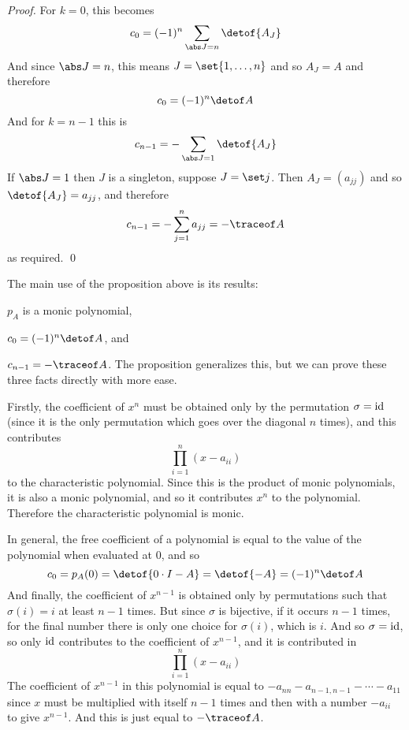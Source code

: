 \begin{proof}
    For $k=0$, this becomes
    \[ c_0 = (-1)^n\sum_{\abs J=n}\detof{A_J} \]
    And since $\abs J=n$, this means $J=\set{1,\dots,n}$ and so $A_J=A$ and therefore
    \[ c_0 = (-1)^n\detof A \]
    And for $k=n-1$ this is
    \[ c_{n-1} = -\sum_{\abs J=1}\detof{A_J} \]
    If $\abs J=1$ then $J$ is a singleton, suppose $J=\set j$.
    Then $A_J=(a_{jj})$ and so $\detof{A_J}=a_{jj}$, and therefore
    \[ c_{n-1} = -\sum_{j=1}^n a_{jj} = -\traceof A \]
    as required.
    \qed

\end{proof}

\begin{note}

    The main use of the proposition above is its results:
    \benum
        \item $p_A$ is a monic polynomial,
        \item $c_0=(-1)^n\detof A$, and
        \item $c_{n-1}=-\traceof A$.
    \eenum
    The proposition generalizes this, but we can prove these three facts directly with more ease.

    Firstly, the coefficient of $x^n$ must be obtained only by the permutation $\sigma=\mathrm{id}$ (since it is the only permutation which goes over the diagonal $n$ times), and this contributes
    \[ \prod_{i=1}^n (x-a_{ii}) \]
    to the characteristic polynomial.
    Since this is the product of monic polynomials, it is also a monic polynomial, and so it contributes $x^n$ to the polynomial.
    Therefore the characteristic polynomial is monic.

    In general, the free coefficient of a polynomial is equal to the value of the polynomial when evaluated at $0$, and so
    \[ c_0 = p_A(0) = \detof{0\cdot I-A} = \detof{-A} = (-1)^n\detof A \]
    And finally, the coefficient of $x^{n-1}$ is obtained only by permutations such that $\sigma(i)=i$ at least $n-1$ times.
    But since $\sigma$ is bijective, if it occurs $n-1$ times, for the final number there is only one choice for $\sigma(i)$, which is $i$.
    And so $\sigma=\mathrm{id}$, so only $\mathrm{id}$ contributes to the coefficient of $x^{n-1}$, and it is contributed in
    \[ \prod_{i=1}^n (x-a_{ii}) \]
    The coefficient of $x^{n-1}$ in this polynomial is equal to $-a_{nn}-a_{n-1,n-1}-\cdots-a_{11}$ since $x$ must be multiplied with itself $n-1$ times and then with a number $-a_{ii}$ to give $x^{n-1}$.
    And this is just equal to $-\traceof A$.

\end{note}

